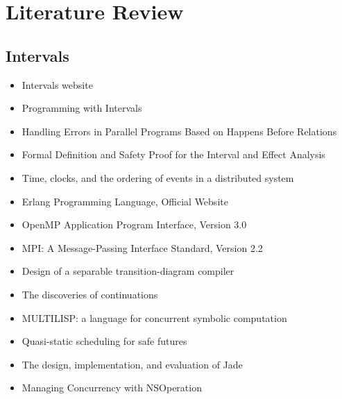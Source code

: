 
\chapter{Literature Review}
\label{cha:literature-review}


\section*{Intervals}
\label{sec:lr-intervals}

\begin{itemize}
\item[\checkmark] Intervals website \cite{Matsakis2010}
\item[\checkmark] Programming with Intervals \cite{Matsakis2009b}
\item[\checkmark] Handling Errors in Parallel Programs Based on
  Happens Before Relations \cite{Matsakis2010a}
\item[\checkmark] Formal Definition and Safety Proof for the Interval
  and Effect Analysis \cite{Matsakis2009}
\item[\checkmark] Time, clocks, and the ordering of events in a
  distributed system \cite{Lamport1978}
\item Erlang Programming Language, Official Website \cite{Erlang2010}
\item OpenMP Application Program Interface, Version 3.0
  \cite{OpenMP2008}
\item MPI: A Message-Passing Interface Standard, Version 2.2
  \cite{MPI2009}
\item Design of a separable transition-diagram compiler
  \cite{Conway1963}
\item The discoveries of continuations \cite{Reynolds1993}
\item MULTILISP: a language for concurrent symbolic computation
  \cite{Halstead1985}
\item Quasi-static scheduling for safe futures \cite{Navabi2008}
\item The design, implementation, and evaluation of Jade
  \cite{Rinard1998}
\item Managing Concurrency with NSOperation \cite{Apple2008}
\end{itemize}


